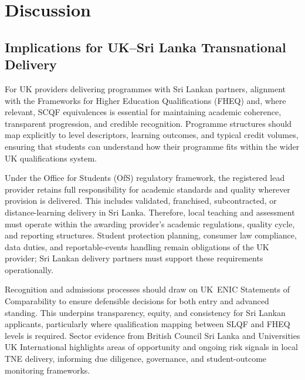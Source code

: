 \section{Discussion}

\subsection{Implications for UK–Sri Lanka Transnational Delivery}

For UK providers delivering programmes with Sri Lankan partners, alignment with the 
Frameworks for Higher Education Qualifications (FHEQ) and, where relevant, SCQF equivalences 
is essential for maintaining academic coherence, transparent progression, and credible 
recognition. Programme structures should map explicitly to level descriptors, learning 
outcomes, and typical credit volumes, ensuring that students can understand how their 
programme fits within the wider UK qualifications system.

Under the Office for Students (OfS) regulatory framework, the registered lead provider retains 
full responsibility for academic standards and quality wherever provision is delivered. This 
includes validated, franchised, subcontracted, or distance-learning delivery in Sri Lanka. 
Therefore, local teaching and assessment must operate within the awarding provider’s academic 
regulations, quality cycle, and reporting structures. Student protection planning, consumer 
law compliance, data duties, and reportable-events handling remain obligations of the UK 
provider; Sri Lankan delivery partners must support these requirements operationally.

Recognition and admissions processes should draw on UK~ENIC Statements of Comparability to 
ensure defensible decisions for both entry and advanced standing. This underpins transparency, 
equity, and consistency for Sri Lankan applicants, particularly where qualification mapping 
between SLQF and FHEQ levels is required. Sector evidence from British Council Sri Lanka and 
Universities UK International highlights areas of opportunity and ongoing risk signals in local 
TNE delivery, informing due diligence, governance, and student-outcome monitoring frameworks.

